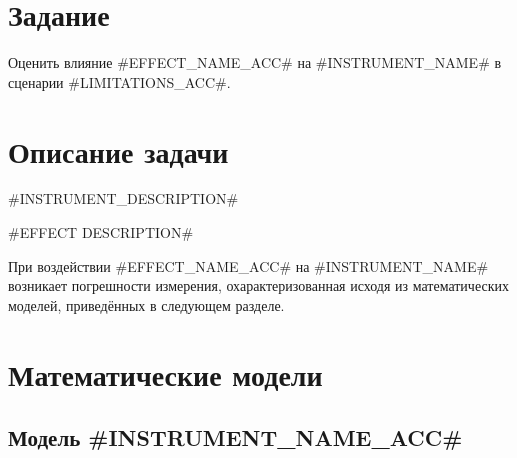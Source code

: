 \documentclass[12pt]{article}   %
\begin{document}
\clearpage

\renewcommand{\baselinestretch}{1.2}
\tableofcontents
\renewcommand{\baselinestretch}{1.5}





\section{Задание}

Оценить влияние #EFFECT_NAME_ACC# на #INSTRUMENT_NAME# в сценарии #LIMITATIONS_ACC#.

\section{Описание задачи}

#INSTRUMENT_DESCRIPTION#

#EFFECT DESCRIPTION#

При воздействии #EFFECT_NAME_ACC# на #INSTRUMENT_NAME# возникает погрешности измерения, охарактеризованная исходя из математических моделей, приведённых в следующем разделе.

\clearpage





\section{Математические модели}

\subsection{Модель #INSTRUMENT_NAME_ACC#}
\end{document}
